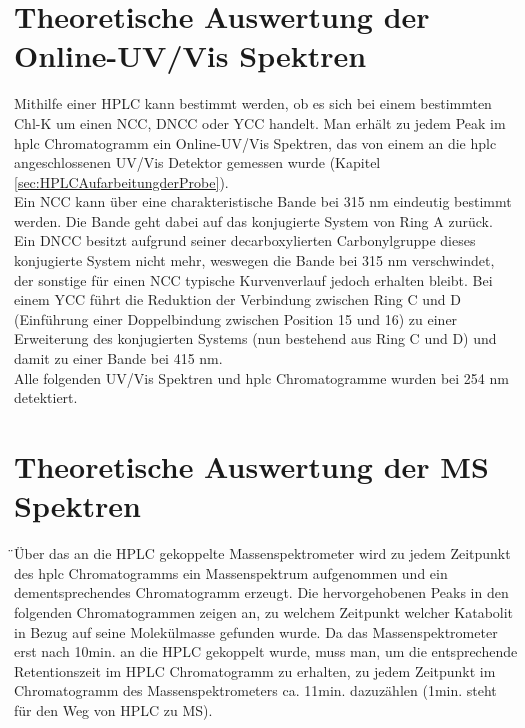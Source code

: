 \section{Theoretische Auswertung der Online-UV/Vis Spektren} \label{sec:IdentifikationUVVis}

Mithilfe einer HPLC kann bestimmt werden, ob es sich bei einem bestimmten \gls{Chl-K} um einen \gls{NCC}, \gls{DNCC} oder \gls{YCC} handelt. Man erhält zu jedem Peak im \gls{hplc} Chromatogramm ein Online-UV/Vis Spektren, das von einem an die \gls{hplc} angeschlossenen UV/Vis Detektor gemessen wurde (Kapitel \ref{sec:HPLCAufarbeitungderProbe}). \\

Ein \gls{NCC} kann über eine charakteristische Bande bei 315 nm eindeutig bestimmt werden. Die Bande geht dabei auf das konjugierte System von Ring A zurück. Ein \gls{DNCC} besitzt aufgrund seiner decarboxylierten Carbonylgruppe dieses konjugierte System nicht mehr, weswegen die Bande bei 315 nm verschwindet, der sonstige für einen \gls{NCC} typische Kurvenverlauf jedoch erhalten bleibt. Bei einem \gls{YCC} führt die Reduktion der Verbindung zwischen Ring C und D (Einführung einer Doppelbindung zwischen Position 15 und 16) zu einer Erweiterung des konjugierten Systems (nun bestehend aus Ring C und D) und damit zu einer Bande bei 415 nm. \\

Alle folgenden UV/Vis Spektren und \gls{hplc} Chromatogramme wurden bei 254 nm detektiert.

\section{Theoretische Auswertung der MS Spektren} \label{sec:IdentifikationMS}

̈Über das an die HPLC gekoppelte Massenspektrometer wird zu jedem Zeitpunkt des \gls{hplc} Chromatogramms ein Massenspektrum aufgenommen und ein dementsprechendes Chromatogramm erzeugt. Die hervorgehobenen Peaks in den folgenden Chromatogrammen zeigen an, zu welchem Zeitpunkt welcher Katabolit in Bezug auf seine Molekülmasse gefunden wurde. Da das Massenspektrometer erst nach 10min. an die HPLC gekoppelt wurde, muss man, um die entsprechende Retentionszeit im HPLC Chromatogramm zu erhalten, zu jedem Zeitpunkt im Chromatogramm des Massenspektrometers ca. 11min. dazuzählen (1min. steht für den Weg von HPLC zu MS).  \\

